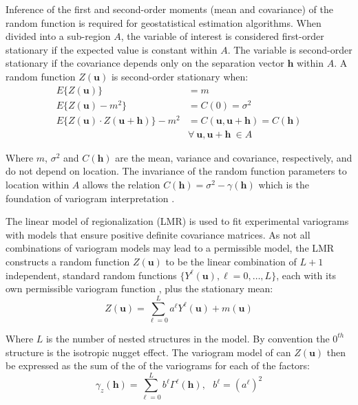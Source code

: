 Inference of the first and second-order moments (mean and covariance) of the random function is required for geostatistical estimation algorithms. When divided into a sub-region $A$, the variable of interest is considered first-order stationary if the expected value is constant within $A$. The variable is second-order stationary if the covariance depends only on the separation vector $\mathbf{h}$ within $A$. A random function $Z(\mathbf{u})$ is second-order stationary when:
\begin{align*}
    E\{Z(\mathbf{u})\}                                        & = m                                                    \\
    E\{Z(\mathbf{u}) - m^2\}                                  & = C(0) = \sigma^2                                      \\
    E\{Z(\mathbf{u}) \cdot Z(\mathbf{u} + \mathbf{h})\} - m^2 & = C(\mathbf{u}, \mathbf{u}+\mathbf{h}) = C(\mathbf{h}) \\
                                                              & \forall \ \mathbf{u}, \mathbf{u}+\mathbf{h} \ \in A
\end{align*}

Where $m$, $\sigma^2$ and $C(\mathbf{h})$ are the mean, variance and covariance, respectively, and do not depend on location. The invariance of the random function parameters to location within $A$ allows the relation $C(\mathbf{h}) = \sigma^2 - \gamma(\mathbf{h})$ which is the foundation of variogram interpretation \citep{pyrcz2014geostatistical}.

The linear model of regionalization (LMR) is used to fit experimental variograms with models that ensure positive definite covariance matrices. As not all combinations of variogram models may lead to a permissible model, the LMR constructs a random function $Z(\mathbf{u})$ to be the linear combination of $L+1$ independent, standard random functions $\{Y^{\ell}(\mathbf{u}), \ell=0,\dots,L\}$, each with its own permissible variogram function \citep{goovaerts1997geostatistics}, plus the stationary mean:
\begin{equation*}
    Z(\mathbf{u}) = \sum_{\ell=0}^{L} a^{\ell} Y^{\ell}(\mathbf{u}) + m(\mathbf{u})
\end{equation*}

Where $L$ is the number of nested structures in the model. By convention the $0^{th}$ structure is the isotropic nugget effect. The variogram model of can $Z(\mathbf{u})$ then be expressed as the sum of the of the variograms for each of the factors:
\begin{equation*}
    \gamma_z(\mathbf{h}) = \sum_{\ell=0}^{L} b^{\ell} \Gamma^{\ell}(\mathbf{h}), \ \ \ b^{\ell} = (a^{\ell})^{2}
\end{equation*}

